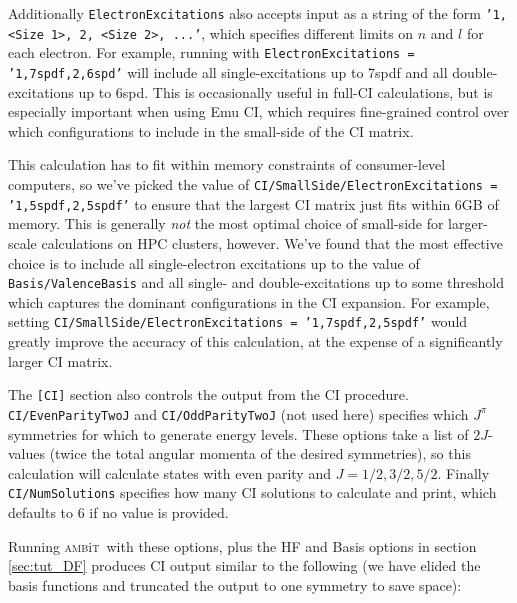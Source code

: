 \documentclass{report}
\newcommand{\ambit}{\textsc{amb}{\footnotesize i}\textsc{t}}
\begin{document}
Additionally \texttt{ElectronExcitations} also accepts input as a string of the form 
\texttt{'1, <Size 1>, 2, <Size 2>, ...'}, which specifies different limits on $n$ and $l$ for each 
electron. For example, running with \texttt{ElectronExcitations = '1,7spdf,2,6spd'} will include all
single-excitations up to 7spdf and all double-excitations up to 6spd. This is occasionally useful in
full-CI calculations, but is especially important when using Emu CI, which requires fine-grained control
over which configurations to include in the small-side of the CI matrix. 

This calculation has to fit within memory constraints of consumer-level computers, so we've picked the
value of \texttt{CI/SmallSide/ElectronExcitations = '1,5spdf,2,5spdf'} to ensure that the largest CI 
matrix just fits within 6GB of memory. This is generally \emph{not} the most optimal choice of
small-side for larger-scale calculations on HPC clusters, however. We've found that the most effective
choice is to include all single-electron excitations up to the value of \texttt{Basis/ValenceBasis} and
all single- and double-excitations up to some threshold which captures the dominant configurations in
the CI expansion. For example, setting \texttt{CI/SmallSide/ElectronExcitations = '1,7spdf,2,5spdf'}
would greatly improve the accuracy of this calculation, at the expense of a significantly larger CI
matrix.

The \texttt{[CI]} section also controls the output from the CI procedure. \texttt{CI/EvenParityTwoJ} and
\texttt{CI/OddParityTwoJ} (not used here) specifies which $J^{\pi}$ symmetries for which to generate 
energy levels. These options take a list of $2J$-values (twice the total angular momenta of the desired
symmetries), so this calculation will calculate states with even parity and $J = 1/2, 3/2, 5/2$. Finally
\texttt{CI/NumSolutions} specifies how many CI solutions to calculate and print, which defaults to 6 if
no value is provided.

Running \ambit\  with these options, plus the HF and Basis options in section \ref{sec:tut_DF} produces
CI output similar to the following (we have elided the basis functions and truncated the output to one
symmetry to save space):
\end{document}
